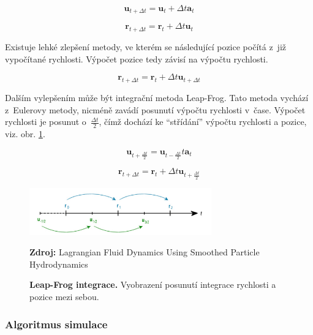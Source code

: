 \begin{equation}
    \mathbf{u}_{t + \Delta t} = \mathbf{u}_t + \Delta t \mathbf{a}_t
\end{equation}

\begin{equation}
    \mathbf{r}_{t + \Delta t} = \mathbf{r}_t + \Delta t \mathbf{u}_t
\end{equation}

Existuje lehké zlepšení metody, ve kterém se následující pozice počítá z~již vypočítané rychlosti. Výpočet pozice tedy závisí na výpočtu rychlosti. \cite{KelagerSPH}

\begin{equation}
    \mathbf{r}_{t + \Delta t} = \mathbf{r}_t + \Delta t \mathbf{u}_{t + \Delta t}
\end{equation}

Dalším vylepšením může být integrační metoda Leap-Frog. Tato metoda vychází z~Eulerovy metody, nicméně zavádí posunutí výpočtu rychlosti v~čase. Výpočet rychlosti je posunut o~$\frac{\Delta t}{2}$, čímž dochází ke \enquote{střídání} výpočtu rychlosti a pozice, viz. obr. \ref{fig:LeapFrog}.

\begin{equation}
    \mathbf{u}_{t + \frac{\Delta t}{2}} = \mathbf{u}_{t - \frac{\Delta t}{2}} t \mathbf{a}_t
    \label{eq:LeapVel}
\end{equation}

\begin{equation}
    \mathbf{r}_{t + \Delta t} = \mathbf{r}_t + \Delta t \mathbf{u}_{t + \frac{\Delta t}{2}}
    \label{eq:LeapPos}
\end{equation}

\begin{figure}[hbt]
	\centering
	\captionsetup{justification=centering}
	\includegraphics[width=0.7\textwidth]{obrazky-figures/leapFrog.PNG}
	\caption{\textbf{Leap-Frog integrace.} Vyobrazení posunutí integrace rychlosti a pozice mezi sebou.}
	\textbf{Zdroj: } Lagrangian Fluid Dynamics Using Smoothed Particle Hydrodynamics \cite{KelagerSPH}
	\label{fig:LeapFrog}
\end{figure}

\subsubsection{Algoritmus simulace}

